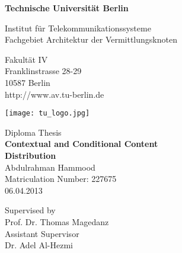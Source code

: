 \thispagestyle{empty}
\begin{center}

\vspace*{0.5cm}
{\LARGE \textbf{Technische Universität Berlin}}

\vspace{0.5cm}

{\large Institut für Telekommunikationssysteme\\[1mm]}
{\large Fachgebiet Architektur der Vermittlungsknoten\\[5mm]}

Fakultät IV\\
Franklinstrasse 28-29\\
10587 Berlin\\
http://www.av.tu-berlin.de\\
\vspace*{1cm}

\texttt{[image: tu\_logo.jpg]}

\vspace*{1.0cm}

{\LARGE Diploma Thesis}\\

\vspace{1.0cm}
{\LARGE \textbf{Contextual and Conditional Content}}\\
\vspace*{0.5cm}
{\LARGE \textbf{Distribution}}\\
\vspace*{1.0cm}
{\LARGE Abdulrahman Hammood}
\\
\vspace*{0.5cm}
Matriculation Number: 227675\\
06.04.2013\\ %
\vspace*{0.5cm}

Supervised by\\
Prof. Dr. Thomas Magedanz\\
\vspace*{0.3cm}
Assistant Supervisor\\
Dr. Adel Al-Hezmi
\vspace{0.5cm}


\end{center}

